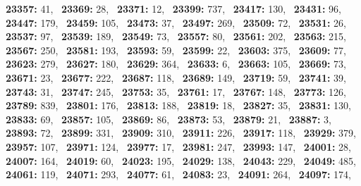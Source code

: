 \textbf{23357:} 41,\allowbreak~ 
\textbf{23369:} 28,\allowbreak~ 
\textbf{23371:} 12,\allowbreak~ 
\textbf{23399:} 737,\allowbreak~ 
\textbf{23417:} 130,\allowbreak~ 
\textbf{23431:} 96,\allowbreak~ 
\textbf{23447:} 179,\allowbreak~ 
\textbf{23459:} 105,\allowbreak~ 
\textbf{23473:} 37,\allowbreak~ 
\textbf{23497:} 269,\allowbreak~ 
\textbf{23509:} 72,\allowbreak~ 
\textbf{23531:} 26,\allowbreak~ 
\textbf{23537:} 97,\allowbreak~ 
\textbf{23539:} 189,\allowbreak~ 
\textbf{23549:} 73,\allowbreak~ 
\textbf{23557:} 80,\allowbreak~ 
\textbf{23561:} 202,\allowbreak~ 
\textbf{23563:} 215,\allowbreak~ 
\textbf{23567:} 250,\allowbreak~ 
\textbf{23581:} 193,\allowbreak~ 
\textbf{23593:} 59,\allowbreak~ 
\textbf{23599:} 22,\allowbreak~ 
\textbf{23603:} 375,\allowbreak~ 
\textbf{23609:} 77,\allowbreak~ 
\textbf{23623:} 279,\allowbreak~ 
\textbf{23627:} 180,\allowbreak~ 
\textbf{23629:} 364,\allowbreak~ 
\textbf{23633:} 6,\allowbreak~ 
\textbf{23663:} 105,\allowbreak~ 
\textbf{23669:} 73,\allowbreak~ 
\textbf{23671:} 23,\allowbreak~ 
\textbf{23677:} 222,\allowbreak~ 
\textbf{23687:} 118,\allowbreak~ 
\textbf{23689:} 149,\allowbreak~ 
\textbf{23719:} 59,\allowbreak~ 
\textbf{23741:} 39,\allowbreak~ 
\textbf{23743:} 31,\allowbreak~ 
\textbf{23747:} 245,\allowbreak~ 
\textbf{23753:} 35,\allowbreak~ 
\textbf{23761:} 17,\allowbreak~ 
\textbf{23767:} 148,\allowbreak~ 
\textbf{23773:} 126,\allowbreak~ 
\textbf{23789:} 839,\allowbreak~ 
\textbf{23801:} 176,\allowbreak~ 
\textbf{23813:} 188,\allowbreak~ 
\textbf{23819:} 18,\allowbreak~ 
\textbf{23827:} 35,\allowbreak~ 
\textbf{23831:} 130,\allowbreak~ 
\textbf{23833:} 69,\allowbreak~ 
\textbf{23857:} 105,\allowbreak~ 
\textbf{23869:} 86,\allowbreak~ 
\textbf{23873:} 53,\allowbreak~ 
\textbf{23879:} 21,\allowbreak~ 
\textbf{23887:} 3,\allowbreak~ 
\textbf{23893:} 72,\allowbreak~ 
\textbf{23899:} 331,\allowbreak~ 
\textbf{23909:} 310,\allowbreak~ 
\textbf{23911:} 226,\allowbreak~ 
\textbf{23917:} 118,\allowbreak~ 
\textbf{23929:} 379,\allowbreak~ 
\textbf{23957:} 107,\allowbreak~ 
\textbf{23971:} 124,\allowbreak~ 
\textbf{23977:} 17,\allowbreak~ 
\textbf{23981:} 247,\allowbreak~ 
\textbf{23993:} 147,\allowbreak~ 
\textbf{24001:} 28,\allowbreak~ 
\textbf{24007:} 164,\allowbreak~ 
\textbf{24019:} 60,\allowbreak~ 
\textbf{24023:} 195,\allowbreak~ 
\textbf{24029:} 138,\allowbreak~ 
\textbf{24043:} 229,\allowbreak~ 
\textbf{24049:} 485,\allowbreak~ 
\textbf{24061:} 119,\allowbreak~ 
\textbf{24071:} 293,\allowbreak~ 
\textbf{24077:} 61,\allowbreak~ 
\textbf{24083:} 23,\allowbreak~ 
\textbf{24091:} 264,\allowbreak~ 
\textbf{24097:} 174,\allowbreak~ 
